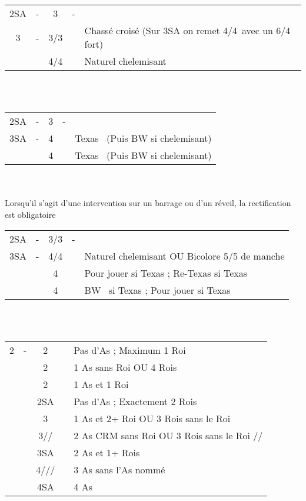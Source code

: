\documentclass[a4paper, oneside, 11pt]{report}
\begin{document}
		\begin{tabular}{cccc|l}
		2SA & - & 3\trefle & - &\\
		3\carreau & - & 3\coeur/3\pique && Chassé croisé (Sur 3SA on remet 4\coeur/4\pique\ avec un 6/4 fort)\\
		&& 4\trefle/4\carreau && Naturel chelemisant\\
		\end{tabular}\\\\

		\begin{tabular}{cccc|l}
		2SA & - & 3\trefle & - &\\
		3SA & - & 4\carreau && Texas \coeur\ (Puis BW si chelemisant)\\
		&& 4\coeur && Texas \pique\ (Puis BW si chelemisant)
		\end{tabular}\\\\

		Lorsqu'il s'agit d'une intervention sur un barrage ou d'un réveil, la rectification est obligatoire\\

		\begin{tabular}{cccc|l}
		2SA & - & 3\carreau/3\coeur & - &\\
		3SA & - & 4\trefle/4\carreau && Naturel chelemisant OU Bicolore 5/5 de manche\\
		&& 4\coeur && Pour jouer si Texas \coeur ; Re-Texas si Texas \pique\\
		&& 4\pique && BW \coeur\ si Texas \coeur ; Pour jouer si Texas \pique\\
		\end{tabular}\\\\

	\begin{tabular}{cccc|l}
	2\trefle & - & 2\carreau && Pas d'As ; Maximum 1 Roi\\
	&& 2\coeur && 1 As sans Roi OU 4 Rois\\
	&& 2\pique && 1 As et 1 Roi\\
	&& 2SA && Pas d'As ; Exactement 2 Rois\\
	&& 3\trefle && 1 As et 2+ Roi OU 3 Rois sans le Roi \trefle\\
	&& 3\carreau/\coeur/\pique && 2 As CRM sans Roi OU 3 Rois sans le Roi \carreau/\coeur/\pique\\
	&& 3SA && 2 As et 1+ Rois\\
	&& 4\trefle/\carreau/\coeur/\pique && 3 As sans l'As nommé\\
	&& 4SA && 4 As\\
	\end{tabular}\\\\
\end{document}
